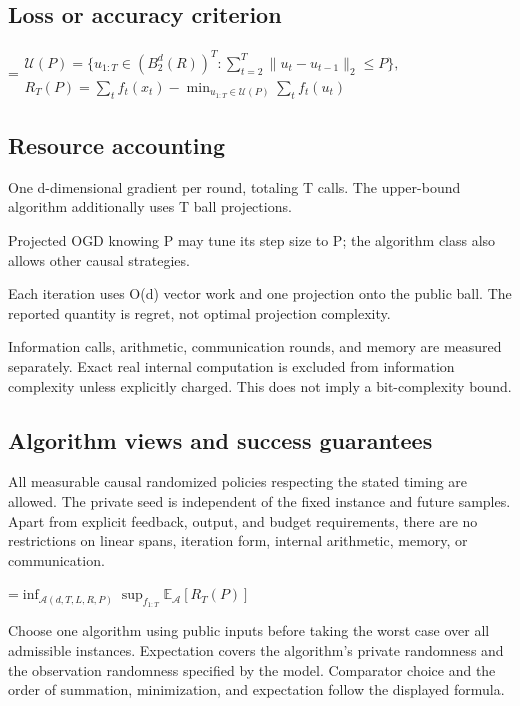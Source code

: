 \documentclass[10pt,a4paper]{article}
\newcommand{\AtlasMath}[1]{\par\begingroup\centering\setbox0=\hbox{$\displaystyle #1$}\ifdim\wd0>1.4\linewidth\typeout{ATLAS WIDE FORMULA: \the\wd0}\fi\ifdim\wd0>\linewidth\resizebox{\linewidth}{!}{\box0}\else\box0\fi\par\endgroup}
\begin{document}
\subsection{Loss or accuracy criterion}

\AtlasMath{\begin{gathered}\mathcal{U}(P)=\{u_{1:T}\in(B_2^d(R))^T:\sum_{t=2}^T\|u_t-u_{t-1}\|_2\le P\},\\[3pt]R_T(P)=\sum_t f_t(x_t)-\min_{u_{1:T}\in\mathcal{U}(P)}\sum_t f_t(u_t)\end{gathered}}


\subsection{Resource accounting}
One d-dimensional gradient per round, totaling T calls. The upper-bound algorithm additionally uses T ball projections.

Projected OGD knowing P may tune its step size to P; the algorithm class also allows other causal strategies.

Each iteration uses O(d) vector work and one projection onto the public ball. The reported quantity is regret, not optimal projection complexity.

Information calls, arithmetic, communication rounds, and memory are measured separately. Exact real internal computation is excluded from information complexity unless explicitly charged. This does not imply a bit-complexity bound.

\subsection{Algorithm views and success guarantees}
All measurable causal randomized policies respecting the stated timing are allowed. The private seed is independent of the fixed instance and future samples. Apart from explicit feedback, output, and budget requirements, there are no restrictions on linear spans, iteration form, internal arithmetic, memory, or communication.


\AtlasMath{\inf_{\mathcal{A}(d,T,L,R,P)}\sup_{f_{1:T}}\mathbb{E}_{\mathcal{A}}[R_T(P)]}


Choose one algorithm using public inputs before taking the worst case over all admissible instances. Expectation covers the algorithm's private randomness and the observation randomness specified by the model. Comparator choice and the order of summation, minimization, and expectation follow the displayed formula.
\end{document}
